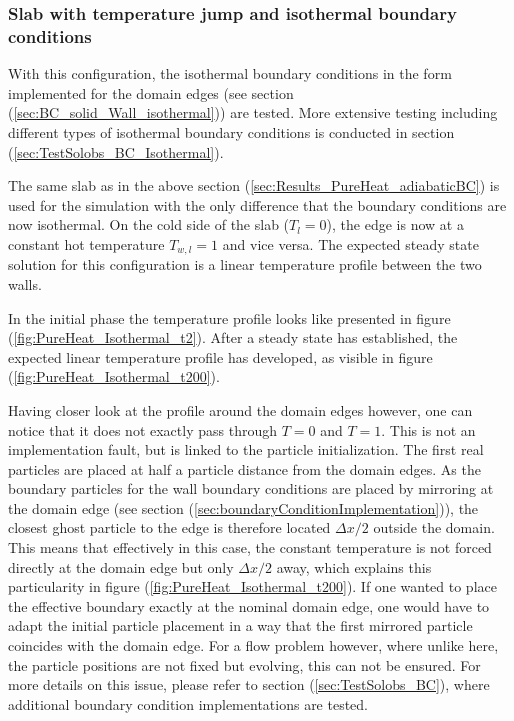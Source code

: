 \documentclass{report}
\begin{document}
\subsubsection{Slab with temperature jump and isothermal boundary conditions}
\label{sec:pureHeat_Results_isothermal_slab}

With this configuration, the isothermal boundary conditions in the form implemented for the domain edges (see section (\ref{sec:BC_solid_Wall_isothermal})) are tested. More extensive testing including different types of isothermal boundary conditions is conducted in section (\ref{sec:TestSolobs_BC_Isothermal}).

The same slab as in the above section (\ref{sec:Results_PureHeat_adiabaticBC}) is used for the simulation with the only difference that the boundary conditions are now isothermal. On the cold side of the slab ($T_l=0$), the edge is now at a constant hot temperature $T_{w,l}=1$ and vice versa. The expected steady state solution for this configuration is a linear temperature profile between the two walls.

In the initial phase the temperature profile looks like presented in figure (\ref{fig:PureHeat_Isothermal_t2}). After a steady state has established, the expected linear temperature profile has developed, as visible in figure (\ref{fig:PureHeat_Isothermal_t200}).  

Having closer look at the profile around the domain edges however, one can notice that it does not exactly pass through $T=0$ and $T=1$. This is not an implementation fault, but is linked to the particle initialization. The first real particles are placed at half a particle distance from the domain edges. As the boundary particles for the wall boundary conditions are placed by mirroring at the domain edge (see section (\ref{sec:boundaryConditionImplementation})), the closest ghost particle to the edge is therefore located $\Delta x/2$ outside the domain. This means that effectively in this case, the constant temperature is not forced directly at the domain edge but only $\Delta x/2$ away, which explains this particularity in figure (\ref{fig:PureHeat_Isothermal_t200}). If one wanted to place the effective boundary exactly at the nominal domain edge, one would have to adapt the initial particle placement in a way that the first mirrored particle coincides with the domain edge. For a flow problem however, where unlike here, the particle positions are not fixed but evolving, this can not be ensured.  For more details on this issue, please refer to section (\ref{sec:TestSolobs_BC}), where additional boundary condition implementations are tested.
\end{document}
